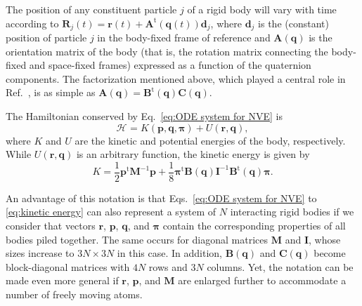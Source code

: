 \documentclass[
journal=jctcce,
layout=twocolumn
]{achemso}
\newcommand{\mt}[1]{\boldsymbol{\mathbf{#1}}}   %
\newcommand{\vt}[1]{\boldsymbol{\mathbf{#1}}}   %
\newcommand{\tr}[1]{#1^\text{t}}                %
\newcommand{\Ham}[1]{{\mathcal H}_\text{#1}}    %
\begin{document}
The position of any constituent particle $j$ of a rigid body will vary with time according to $\vt R_j(t) = \vt r(t) + \tr{\mt A}(\vt q(t))\vt d_j$, where $\vt d_j$ is the (constant) position of particle $j$ in the body-fixed frame of reference and ${\mt A}(\vt q)$ is the orientation matrix of the body (that is, the rotation matrix connecting the body-fixed and space-fixed frames) expressed as a function of the quaternion components.
The factorization mentioned above, which played a central role in Ref.~, is as simple as ${\mt A}(\vt q) = \tr{\mt B}(\vt q) {\mt C}(\vt q)$.

The Hamiltonian conserved by Eq.~\eqref{eq:ODE system for NVE} is
\begin{equation}
\label{eq:Hamiltonian}
\Ham{} = K(\vt p, \vt q, \vt \pi) + U(\vt r,\vt q),
\end{equation}
where $K$ and $U$ are the kinetic and potential energies of the body, respectively.
While $U(\vt r, \vt q)$ is an arbitrary function, the kinetic energy is given by
\begin{equation}
\label{eq:kinetic energy}
K = \frac{1}{2} \tr{\vt p} {\mt M}^{-1} {\vt p} + \frac{1}{8} \tr{\vt \pi} {\mt B}(\vt q) {\mt I}^{-1} \tr{\mt B}(\vt q) {\vt \pi}.
\end{equation}

An advantage of this notation is that Eqs.~\eqref{eq:ODE system for NVE} to \eqref{eq:kinetic energy} can also represent a system of $N$ interacting rigid bodies if we consider that vectors $\vt r$, $\vt p$, $\vt q$, and $\vt \pi$ contain the corresponding properties of all bodies piled together.
The same occurs for diagonal matrices $\mt M$ and $\mt I$, whose sizes increase to $3N \times 3N$ in this case.
In addition, $\mt B(\vt q)$ and $\mt C(\vt q)$ become block-diagonal matrices with $4N$ rows and $3N$ columns.
Yet, the notation can be made even more general if $\vt r$, $\vt p$, and $\mt M$ are enlarged further to accommodate a number of freely moving atoms.
\end{document}
